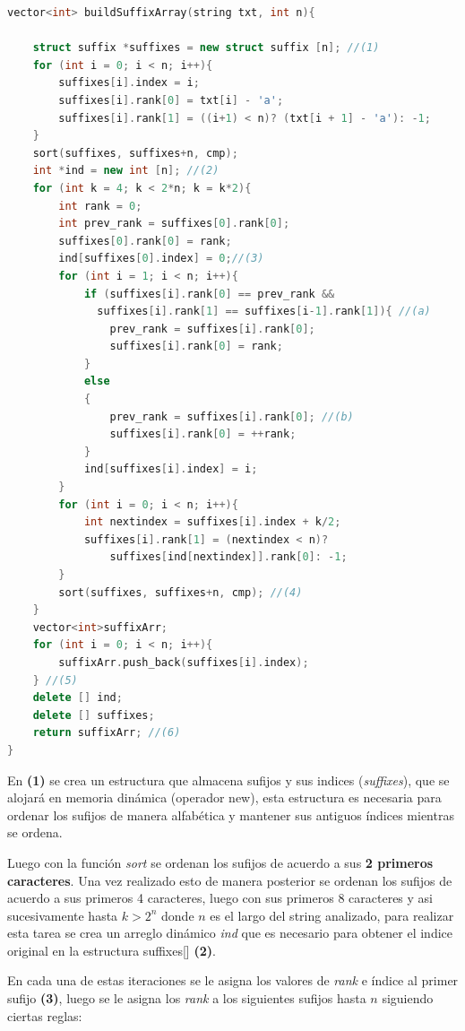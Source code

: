\begin{lstlisting}[language=C++, caption=Función principal arreglo de sufijos (1).]
vector<int> buildSuffixArray(string txt, int n){

	struct suffix *suffixes = new struct suffix [n]; //(1)
	for (int i = 0; i < n; i++){
		suffixes[i].index = i;
		suffixes[i].rank[0] = txt[i] - 'a';
		suffixes[i].rank[1] = ((i+1) < n)? (txt[i + 1] - 'a'): -1;
	}
	sort(suffixes, suffixes+n, cmp); 
	int *ind = new int [n]; //(2)
	for (int k = 4; k < 2*n; k = k*2){
		int rank = 0;
		int prev_rank = suffixes[0].rank[0];
		suffixes[0].rank[0] = rank;
		ind[suffixes[0].index] = 0;//(3)
		for (int i = 1; i < n; i++){
			if (suffixes[i].rank[0] == prev_rank && 
			  suffixes[i].rank[1] == suffixes[i-1].rank[1]){ //(a)
				prev_rank = suffixes[i].rank[0];
				suffixes[i].rank[0] = rank;
			}
			else
			{
				prev_rank = suffixes[i].rank[0]; //(b)
				suffixes[i].rank[0] = ++rank;
			}
			ind[suffixes[i].index] = i;
		}
		for (int i = 0; i < n; i++){
			int nextindex = suffixes[i].index + k/2;
			suffixes[i].rank[1] = (nextindex < n)?
			    suffixes[ind[nextindex]].rank[0]: -1;
		}
		sort(suffixes, suffixes+n, cmp); //(4)
	}
	vector<int>suffixArr;
	for (int i = 0; i < n; i++){
        suffixArr.push_back(suffixes[i].index);
    } //(5)
	delete [] ind;
	delete [] suffixes;
	return suffixArr; //(6)
}

\end{lstlisting}

En \textbf{(1)} se crea un estructura que almacena sufijos y sus indices (\textit{suffixes}), que se alojará en memoria dinámica (operador new), esta estructura es necesaria para ordenar los sufijos de manera alfabética y mantener sus antiguos índices mientras se ordena. 

Luego con la función \textit{sort} se ordenan los sufijos de acuerdo a sus \textbf{2 primeros caracteres}. Una vez realizado esto de manera posterior se ordenan los sufijos de acuerdo a sus primeros 4 caracteres, luego con sus primeros 8 caracteres y asi sucesivamente hasta $k > 2^{n}$ donde $n$ es el largo del string analizado, para realizar esta tarea se crea un arreglo dinámico \textit{ind} que es necesario para obtener el indice original en la estructura suffixes[] \textbf{(2)}.

En cada una de estas iteraciones se le asigna los valores de \textit{rank} e índice al primer sufijo \textbf{(3)}, luego se le asigna los \textit{rank} a los siguientes sufijos hasta $n$ siguiendo ciertas reglas:

